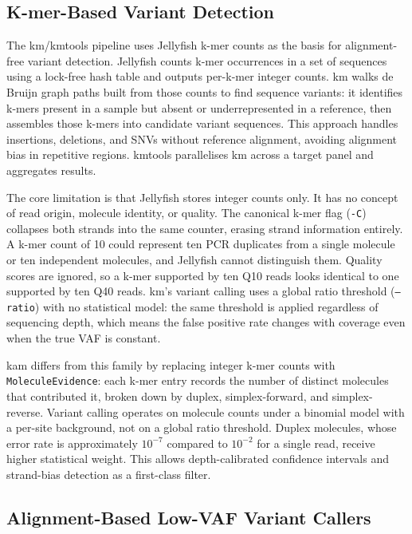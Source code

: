 \subsection{K-mer-Based Variant Detection}

The km/kmtools pipeline \autocite{Bourgey19km} uses Jellyfish \autocite{Marcais11jellyfish} k-mer counts as the basis for alignment-free variant detection. Jellyfish counts k-mer occurrences in a set of sequences using a lock-free hash table and outputs per-k-mer integer counts. km walks de Bruijn graph paths built from those counts to find sequence variants: it identifies k-mers present in a sample but absent or underrepresented in a reference, then assembles those k-mers into candidate variant sequences. This approach handles insertions, deletions, and SNVs without reference alignment, avoiding alignment bias in repetitive regions. kmtools parallelises km across a target panel and aggregates results.

The core limitation is that Jellyfish stores integer counts only. It has no concept of read origin, molecule identity, or quality. The canonical k-mer flag (\texttt{-C}) collapses both strands into the same counter, erasing strand information entirely. A k-mer count of 10 could represent ten PCR duplicates from a single molecule or ten independent molecules, and Jellyfish cannot distinguish them. Quality scores are ignored, so a k-mer supported by ten Q10 reads looks identical to one supported by ten Q40 reads. km's variant calling uses a global ratio threshold (\texttt{--ratio}) with no statistical model: the same threshold is applied regardless of sequencing depth, which means the false positive rate changes with coverage even when the true VAF is constant.

kam differs from this family by replacing integer k-mer counts with \texttt{MoleculeEvidence}: each k-mer entry records the number of distinct molecules that contributed it, broken down by duplex, simplex-forward, and simplex-reverse. Variant calling operates on molecule counts under a binomial model with a per-site background, not on a global ratio threshold. Duplex molecules, whose error rate is approximately $10^{-7}$ compared to $10^{-2}$ for a single read, receive higher statistical weight. This allows depth-calibrated confidence intervals and strand-bias detection as a first-class filter.

\subsection{Alignment-Based Low-VAF Variant Callers}

